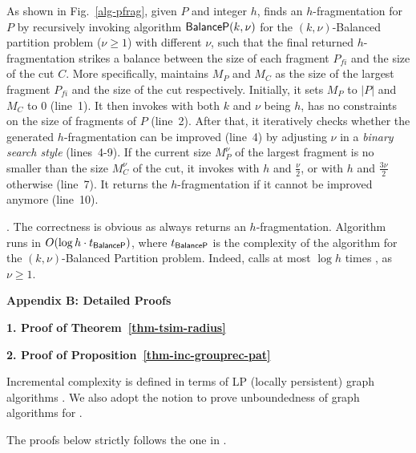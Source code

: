 As shown in Fig.~\ref{alg-pfrag}, given $P$ and integer $h$,
 finds an $h$-fragmentation for $P$ by recursively invoking algorithm ${\mathsf{BalanceP}}(k,\nu)$ for the {\sc $(k,\nu)$-Balanced partition} problem ($\nu\geq 1$) with different $\nu$,
such that the final returned $h$-fragmentation strikes a balance between the size of each fragment ${P}_{fi}$ and the size of the cut $C$.
More specifically,  maintains $M_P$ and $M_C$ as the size of the largest fragment ${P}_{fi}$ and the size of the cut respectively.
Initially, it sets $M_P$ to $|P|$ and $M_C$ to 0 (line~1).
It then invokes  with both $k$ and $\nu$ being $h$, \ie has no constraints on the size of fragments of $P$ (line~2).
After that, it iteratively checks whether the generated $h$-fragmentation can be improved (line~4) by adjusting $\nu$ in a {\em binary search style} (lines~4-9).
If the current size $M^\nu_P$ of the largest fragment is no smaller than the size $M^\nu_C$ of the cut,
it invokes  with $h$ and $\frac{\nu}{2}$, or with $h$ and $\frac{3\nu}{2}$ otherwise (line~7).
It returns the $h$-fragmentation if it cannot be improved anymore (line~10).

\vspace{-1.5ex}
.
The correctness is obvious as  always returns an $h$-fragmentation.
Algorithm~ runs in $O(\log h\cdot t_{{\mathsf{BalanceP}}})$, where $t_{{\mathsf{BalanceP}}}$ is the complexity of the algorithm for the {\sc $(k,\nu)$-Balanced Partition} problem. Indeed,  calls at most $\log h$ times , as $\nu\geq 1$.


\vspace{1ex}
\noindent
{\large \textbf{Appendix B: Detailed Proofs}}
\label{sec-apd-proofs}

\noindent
{\textbf{1. Proof of Theorem~\ref{thm-tsim-radius}}}



\noindent
{\textbf{2. Proof of Proposition~\ref{thm-inc-grouprec-pat}}}

Incremental complexity is defined in terms of LP (locally persistent) graph algorithms \cite{Reps96}.
We also adopt the notion to prove unboundedness of graph algorithms for \dynteamF.

\vspace{-1.5ex}
The proofs below strictly follows the one in \cite{Reps96}.

